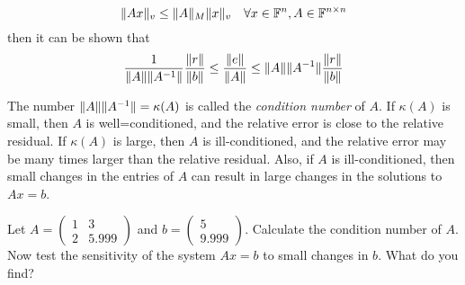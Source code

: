 \begin{equation} \label{eq:normcondition}
\lVert Ax\rVert_v \leq \lVert A\rVert_M\lVert x\rVert_v \quad \forall x \in  \mathbb{F}^n, A \in \mathbb{F}^{n \times n}
\end{equation}
then it can be shown that 
\begin{equation*}
\frac{1}{\lVert A\rVert \lVert A^{-1}\rVert} \frac{\lVert r\rVert}{\lVert b\rVert} \leq \frac{\lVert e\rVert}{\lVert A\rVert} \leq \lVert A\rVert \lVert A^{-1}\rVert \frac{\lVert r\rVert}{\lVert b\rVert}
\end{equation*}

The number $\lVert A\rVert \lVert A^{-1}\rVert = \kappa (A)$ is called the \emph{condition number} of $A$. If $\kappa (A)$ is small, then $A$ is well=conditioned, and the relative error is close to the relative residual. If $\kappa (A)$ is large, then $A$ is ill-conditioned, and the relative error may be many times larger than the relative residual. Also, if $A$ is ill-conditioned, then small changes in the entries of $A$ can result in large changes in the solutions to $Ax = b$. 

\begin{problem}
Let $A =\begin{pmatrix}1 & 3\\2 & 5.999\end{pmatrix}$ and $b = \begin{pmatrix}5\\9.999\end{pmatrix}$. Calculate the condition number of $A$. Now test the sensitivity of the system $Ax = b$ to small changes in $b$. What do you find?
\end{problem}
